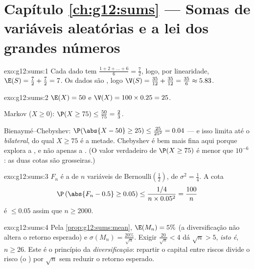 \section*{Capítulo \ref{ch:g12:sums} --- Somas de variáveis aleatórias e a lei dos grandes números}

\begin{solution}{exo:g12:sums:1}
Cada dado tem 
$\frac{1 + 2 + \dots + 6}{6} = \frac{7}{2}$, logo, por linearidade,
$\E(S) = \frac72 + \frac72 = 7$. Os dados são , logo
$\V(S) = \frac{35}{12} + \frac{35}{12} = \frac{35}{6} \approx 5.83$.
\end{solution}

\begin{solution}{exo:g12:sums:2}
$\E(X) = 50$ e $\V(X) = 100 \times 0.25 = 25$.

Markov ($X \geq 0$): $\P(X \geq 75) \leq \frac{50}{75} = \frac23$.

Bienaymé--Chebyshev:
$\P(\abs{X - 50} \geq 25) \leq \frac{25}{25^2} = 0.04$ --- e isso limita
até o  \emph{bilateral}, do qual $X \geq 75$ é a metade. Chebyshev é
bem mais fina aqui porque explora a , e não apenas a . (O
valor verdadeiro de $\P(X \geq 75)$ é menor que $10^{-6}$: as duas cotas
são grosseiras.)
\end{solution}

\begin{solution}{exo:g12:sums:3}
$F_n$ é a  de $n$ variáveis de
Bernoulli$\left(\frac12\right)$, de  $\sigma^2 = \frac14$. A cota
\[
\P\left(\abs{F_n - 0.5} \geq 0.05\right)
\leq \frac{1/4}{n \times 0.05^2} = \frac{100}{n}
\]
é $\leq 0.05$ assim que $n \geq 2000$.
\end{solution}

\begin{solution}{exo:g12:sums:4}
Pela \cref{prop:g12:sums:mean}, $\E(M_n) = 5\%$ (a diversificação não
altera o retorno esperado) e
$\sigma(M_n) = \frac{20\%}{\sqrt n}$. Exigir
$\frac{20}{\sqrt n} < 4$ dá $\sqrt n > 5$, \emph{isto é}, $n \geq 26$.
Este é o princípio da \emph{diversificação}: repartir o capital entre
riscos  divide o risco (o ) por $\sqrt n$ sem
reduzir o retorno esperado.
\end{solution}


